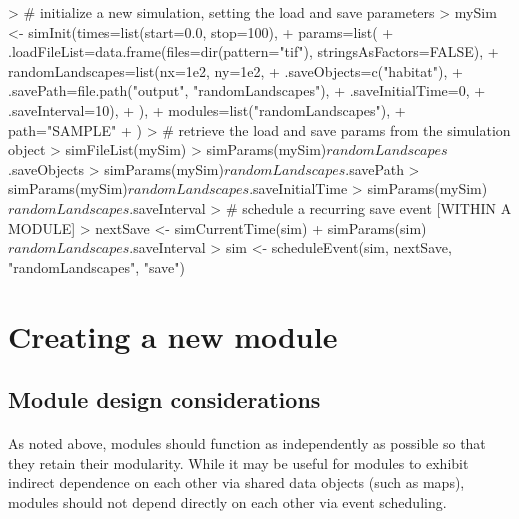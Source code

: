 \documentclass{article}
\begin{document}
\begin{Schunk}
\begin{Sinput}
> # initialize a new simulation, setting the load and save parameters
> mySim <- simInit(times=list(start=0.0, stop=100),
+                  params=list(
+                    .loadFileList=data.frame(files=dir(pattern="tif"), stringsAsFactors=FALSE),
+                    randomLandscapes=list(nx=1e2, ny=1e2,
+                                 .saveObjects=c("habitat"),
+                                 .savePath=file.path("output", "randomLandscapes"),
+                                 .saveInitialTime=0,
+                                 .saveInterval=10),
+                    ),
+                  modules=list("randomLandscapes"),
+                  path="SAMPLE"
+ )
> # retrieve the load and save params from the simulation object
> simFileList(mySim)
> simParams(mySim)$randomLandscapes$.saveObjects
> simParams(mySim)$randomLandscapes$.savePath
> simParams(mySim)$randomLandscapes$.saveInitialTime
> simParams(mySim)$randomLandscapes$.saveInterval
> # schedule a recurring save event [WITHIN A MODULE]
> nextSave <- simCurrentTime(sim) + simParams(sim)$randomLandscapes$.saveInterval
> sim <- scheduleEvent(sim, nextSave, "randomLandscapes", "save")
\end{Sinput}
\end{Schunk}

\newpage

\section{Creating a new module}

\subsection{Module design considerations}

\paragraph{}
\textit{\color{blue}{perhaps a bit about design phlosophy, relating back to dependencies and how to carefully build modules that actually retain modularity.}}

\paragraph{}
As noted above, modules should function as independently as possible so that they retain their modularity. While it may be useful for modules to exhibit indirect dependence on each other via shared data objects (such as maps), modules should not depend directly on each other via event scheduling.
\end{document}
